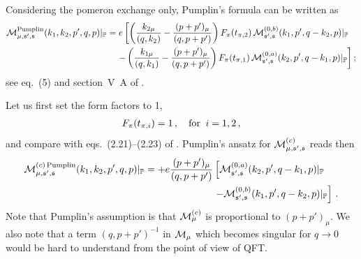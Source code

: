 \documentclass[a4paper,11pt]{article}
\newcommand{\Pom}{\mathbb{P}}
\begin{document}
Considering the pomeron exchange only,
Pumplin's formula can be written as
%
\begin{align}
{\cal M}^{\rm Pumplin}_{\mu, \mathfrak{s'},\mathfrak{s}}(k_{1},k_{2},p',q,p)|_{\Pom} %
= &\;
e 
\left[
\left(
\frac{k_{2 \mu}}{(q, k_{2})} - \frac{(p + p')_{\mu}}{(q, p + p')}
\right) F_{\pi}(t_{\pi,2}) \,
{\cal M}_{\mathfrak{s'},\mathfrak{s}}^{(0,b)}(k_{1},p',q-k_{2},p)|_{\Pom} 
\right. \nonumber\\
& \left.
- 
\left(
\frac{k_{1 \mu}}{(q, k_{1})} - \frac{(p + p')_{\mu}}{(q, p + p')}
\right) F_{\pi}(t_{\pi,1}) \,
{\cal M}_{\mathfrak{s'},\mathfrak{s}}^{(0,a)}(k_{2},p',q-k_{1},p)|_{\Pom}
\right];
\label{A.1}
\end{align}
%
see eq.~(5) and section~V~A of \cite{Pumplin:1970kp}.

Let us first set the form factors to 1,
%
\begin{eqnarray}
F_{\pi}(t_{\pi,i}) = 1\,, \quad {\rm for} \;\; i = 1,2\,,
\label{A.100}
\end{eqnarray}
%
and compare with eqs.~(2.21)--(2.23) of \cite{Lebiedowicz:2025xob}.
Pumplin's ansatz for ${\cal M}^{(c)}_{\mu,\mathfrak{s'},\mathfrak{s}}$
reads then
%
\begin{align}
{\cal M}^{(c) \, {\rm Pumplin}}_{\mu, \mathfrak{s'},\mathfrak{s}}(k_{1},k_{2},p',q,p)|_{\Pom}
= 
+ e  \frac{(p + p')_{\mu}}{(q, p + p')}
&\left[
{\cal M}_{\mathfrak{s'},\mathfrak{s}}^{(0,a)}(k_{2},p',q-k_{1},p)|_{\Pom} 
\right. \nonumber\\
& \left.
- 
{\cal M}_{\mathfrak{s'},\mathfrak{s}}^{(0,b)}(k_{1},p',q-k_{2},p)|_{\Pom}
\right]\,.
\label{A.101}
\end{align}
%
Note that Pumplin's assumption is that 
${\cal M}^{(c)}_{\mu}$ is proportional to $(p + p')_{\mu}$.
We also note that a term $(q, p + p')^{-1}$ in ${\cal M}_{\mu}$
which becomes singular for $q \to 0$ would be hard to understand
from the point of view of QFT.
\end{document}
